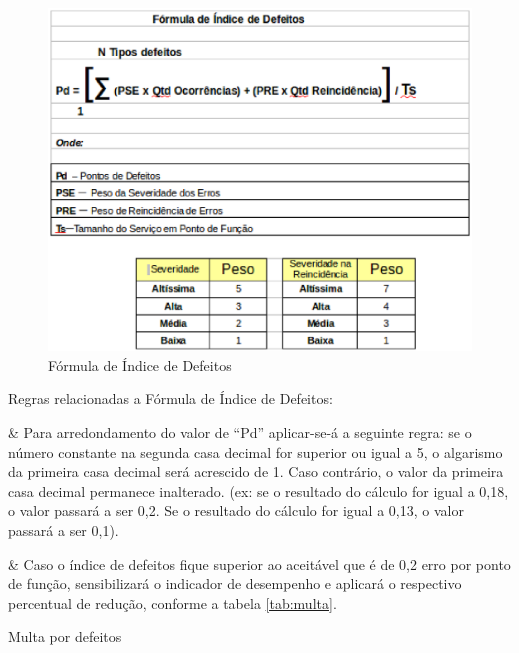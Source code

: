 \begin{figure}[h!]
\centering
\includegraphics[keepaspectratio=false,scale=0.5]{figuras/figuras_nilton/formula.eps}
\caption{Fórmula de Índice de Defeitos}
\label{formula}
\end{figure}

\begin{table}[!ht]
	\begin{center}


\begin{easylist}[itemize]

\begin{flushleft}
Regras relacionadas a Fórmula de Índice de Defeitos:\linebreak[1] 
\end{flushleft}


& Para arredondamento do valor de “Pd” aplicar-se-á a seguinte regra: se o número constante na segunda casa decimal for superior ou igual a 5, o algarismo da primeira casa decimal será acrescido de 1. Caso contrário, o valor da primeira casa decimal permanece inalterado. (ex: se o resultado do cálculo for igual a 0,18, o valor passará a ser 0,2. Se o resultado do cálculo for igual a 0,13, o valor passará a ser 0,1).

& Caso o índice de defeitos fique superior ao aceitável que é de 0,2 erro por ponto de função, sensibilizará o indicador de desempenho e aplicará o respectivo percentual de redução, conforme a tabela \ref{tab:multa}.\linebreak[1]  
 
\end{easylist}
	
	 
	\caption{Multa por defeitos}
	\label{tab:multa}
	\end{center}
	\end{table}	
	\FloatBarrier
	
